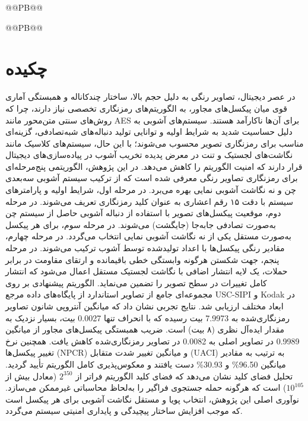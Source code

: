 @@PB@@



@@PB@@




\setcounter{page}{1}

\chapter*{چکیده}
در عصر دیجیتال، تصاویر رنگی به دلیل حجم بالا، ساختار چندکاناله و همبستگی آماری قوی میان پیکسل‌های مجاور، به الگوریتم‌های رمزنگاری تخصصی نیاز دارند، چرا که روش‌های سنتی متن‌محور مانند AES برای آن‌ها ناکارآمد هستند. سیستم‌های آشوبی به دلیل حساسیت شدید به شرایط اولیه و توانایی تولید دنباله‌های شبه‌تصادفی، گزینه‌ای مناسب برای رمزنگاری تصویر محسوب می‌شوند؛ با این حال، سیستم‌های کلاسیک مانند نگاشت‌های لجستیک و تنت در معرض پدیده تخریب آشوب در پیاده‌سازی‌های دیجیتال قرار دارند که امنیت الگوریتم را کاهش می‌دهد. در این پژوهش، الگوریتمی پنج‌مرحله‌ای برای رمزنگاری تصاویر رنگی معرفی شده است که از ترکیب سیستم آشوبی سه‌بعدی چن و نه نگاشت آشوبی نمایی بهره می‌برد. در مرحله اول، شرایط اولیه و پارامترهای سیستم با دقت ۱۵ رقم اعشاری به عنوان کلید رمزنگاری تعریف می‌شوند. در مرحله دوم، موقعیت پیکسل‌های تصویر با استفاده از دنباله آشوبی حاصل از سیستم چن به‌صورت تصادفی جابه‌جا (جایگشت) می‌شوند. در مرحله سوم، برای هر پیکسل به‌صورت مستقل یکی از نه نگاشت آشوبی نمایی انتخاب می‌گردد. در مرحله چهارم، مقادیر رنگی پیکسل‌ها با اعداد تولیدشده توسط آشوب ترکیب می‌شوند. در مرحله پنجم، جهت شکستن هرگونه وابستگی خطی باقیمانده و ارتقای مقاومت در برابر حملات، یک لایه انتشار اضافی با نگاشت لجستیک مستقل اعمال می‌شود که انتشار کامل تغییرات در سطح تصویر را تضمین می‌نماید. الگوریتم پیشنهادی بر روی مجموعه‌ای جامع از تصاویر استاندارد از پایگاه‌های داده مرجع USC-SIPI و Kodak در ابعاد مختلف ارزیابی شد. نتایج تجربی نشان داد که میانگین آنتروپی شانون تصاویر رمزنگاری‌شده به 7.9973 بیت رسیده که با انحراف تنها 0.0027 بیت، بسیار نزدیک به مقدار ایده‌آل نظری (۸ بیت) است. ضریب همبستگی پیکسل‌های مجاور از میانگین 0.9989 در تصاویر اصلی به 0.0082 در تصاویر رمزنگاری‌شده کاهش یافت. همچنین نرخ تغییر پیکسل‌ها (NPCR) و میانگین تغییر شدت متقابل (UACI) به ترتیب به مقادیر میانگین 96.50\% و 30.93\% دست یافتند و معکوس‌پذیری کامل الگوریتم تأیید گردید. تحلیل فضای کلید نشان می‌دهد که فضای کلید الگوریتم فراتر از $2^{350}$ (معادل بیش از $10^{105}$) است که هرگونه حمله جستجوی فراگیر را به‌لحاظ محاسباتی غیرممکن می‌سازد. نوآوری اصلی این پژوهش، انتخاب پویا و مستقل نگاشت آشوبی برای هر پیکسل است که موجب افزایش ساختار پیچیدگی و پایداری امنیتی سیستم می‌گردد.

